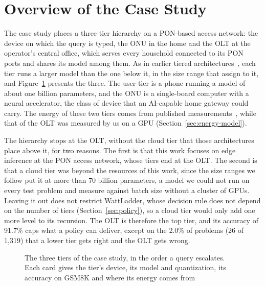 \documentclass[cic,dipl,english]{infufrgs}
\begin{document}
\section{Overview of the Case Study}
\label{sec:overview}

The case study places a three-tier hierarchy on a PON-based access network: the device on which the query is typed, the ONU in the home and the OLT at the operator's
central office, which serves every household connected to its PON ports and shares its model
among them. As in earlier tiered
architectures~\cite{wu2025recserve,pakpahan2026continuum}, each tier runs a larger model
than the one below it, in the size range that  assign
to it, and Figure~\ref{fig:case-study} presents the three. The user tier is a
phone running a model of about one billion parameters, and the ONU is a single-board
computer with a neural accelerator, the class of device that an AI-capable home gateway
could carry. The energy of these two tiers comes from published
measurements~\cite{cai2026npu,renney2026cloud}, while that of the OLT was measured by us
on a GPU (Section~\ref{sec:energy-model}).

The hierarchy stops at the OLT, without the cloud tier that those architectures place
above it, for two reasons. The first is that this work focuses on edge inference at the PON access network,
whose tiers end at the OLT. The second is that a cloud tier was beyond the resources of
this work, since the size ranges we follow put it at more than 70 billion parameters, a
model we could not run on every test problem and measure against batch size without a
cluster of GPUs. Leaving it out does not
restrict WattLadder, whose decision rule does not depend on the number of tiers
(Section~\ref{sec:policy}), so a cloud tier would only add one more level to its
recursion. The OLT is therefore the top tier, and its accuracy of 91.7\% caps what a policy
can deliver, except on the 2.0\% of problems (26 of 1,319) that a lower tier gets right and
the OLT gets wrong.

\begin{figure}[htb]
  \centering
  \caption[The three tiers of the case study, in the order a query escalates]{The three tiers of the case study, in the order a query escalates.
  Each card gives the tier's device, its model and quantization, its accuracy on GSM8K and where its energy comes from}
  \label{fig:case-study}
  \vspace{6pt}
  
\end{figure}
\end{document}
